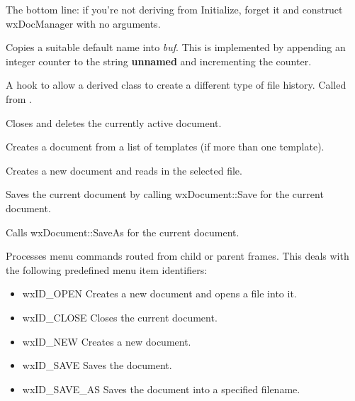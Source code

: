 The bottom line: if you're not deriving from Initialize, forget it and
construct wxDocManager with no arguments.



Copies a suitable default name into {\it buf}. This is implemented by
appending an integer counter to the string {\bf unnamed} and incrementing
the counter.



A hook to allow a derived class to create a different type of file history. Called
from .



Closes and deletes the currently active document.



Creates a document from a list of templates (if more than one template).



Creates a new document and reads in the selected file.



Saves the current document by calling wxDocument::Save for the current document.



Calls wxDocument::SaveAs for the current document.



Processes menu commands routed from child or parent frames. This deals
with the following predefined menu item identifiers:

\begin{itemize}\itemsep=0pt
\item wxID\_OPEN Creates a new document and opens a file into it.
\item wxID\_CLOSE Closes the current document.
\item wxID\_NEW Creates a new document.
\item wxID\_SAVE Saves the document.
\item wxID\_SAVE\_AS Saves the document into a specified filename.
\end{itemize}


